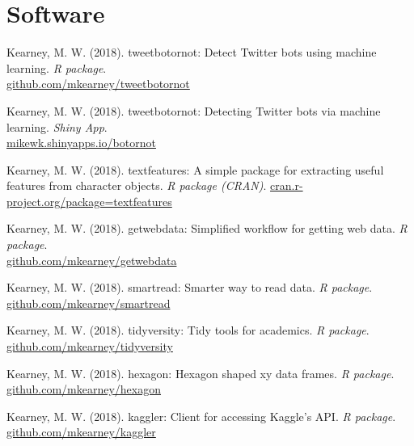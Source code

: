\section{Software}

\begin{bibenum}

  \item Kearney, M. W. (2018).
    tweetbotornot: Detect Twitter bots using machine learning.
    \textit{R package}.
    \\ \href{https://github.com/mkearney/tweetbotornot}{github.com/mkearney/tweetbotornot}

  \item Kearney, M. W. (2018).
    tweetbotornot: Detecting Twitter bots via machine learning.
    \textit{Shiny App}.
    \\ \href{https://mikewk.shinyapps.io/botornot/}{mikewk.shinyapps.io/botornot}

  \item Kearney, M. W. (2018).
    textfeatures: A simple package for extracting useful features from character objects.
    \textit{R package (CRAN)}.
    \href{http://cran.r-project.org/package=textfeatures}{cran.r-project.org/package=textfeatures}

  \item Kearney, M. W. (2018).
    getwebdata: Simplified workflow for getting web data.
    \textit{R package}.
    \\ \href{https://github.com/mkearney/getwebdata}{github.com/mkearney/getwebdata}

  \item Kearney, M. W. (2018).
    smartread: Smarter way to read data.
    \textit{R package}.
    \href{https://github.com/mkearney/smartread}{github.com/mkearney/smartread}

  \item Kearney, M. W. (2018).
    tidyversity: Tidy tools for academics.
    \textit{R package}.
    \href{https://github.com/mkearney/tidyversity}{github.com/mkearney/tidyversity}

  \item Kearney, M. W. (2018).
    hexagon: Hexagon shaped xy data frames.
    \textit{R package}.
    \href{https://github.com/mkearney/hexagon}{github.com/mkearney/hexagon}

  \item Kearney, M. W. (2018).
    kaggler: Client for accessing Kaggle’s API.
    \textit{R package}.
    \href{https://github.com/mkearney/kaggler}{github.com/mkearney/kaggler}


\end{bibenum}
